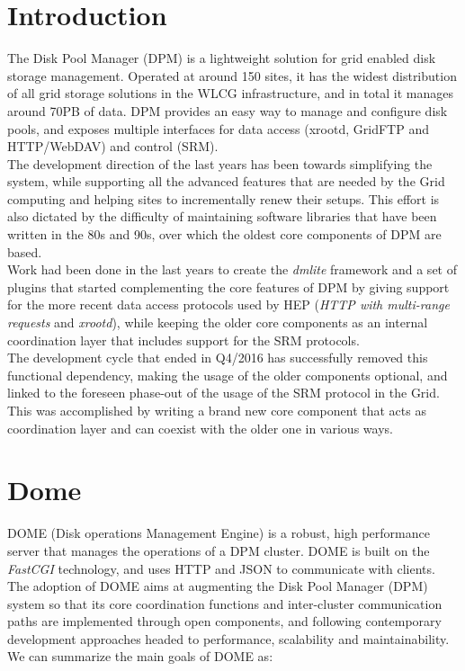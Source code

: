 \documentclass[a4paper]{jpconf}
\begin{document}
\section{Introduction}
The Disk Pool Manager (DPM) is a lightweight solution for grid enabled disk storage
management. Operated at around 150 sites, it has the widest distribution of all grid storage
solutions in the WLCG infrastructure, and in total it manages around 70PB of data. DPM provides
an easy way to manage and configure disk pools, and exposes multiple interfaces for
data access (xrootd, GridFTP and HTTP/WebDAV) and control (SRM).\\
The development direction of the last years has been towards simplifying the
system, while supporting all the advanced features that are needed by the Grid computing and
helping sites to incrementally renew their setups.
This effort is also dictated by the difficulty of maintaining software libraries that have been
written in the 80s and 90s, over which the oldest core components of DPM are based.\\
Work had been done in the last years to create the \textit{dmlite} \cite{dpmfuture} framework and a set of plugins
that started complementing the core features of DPM by giving support for the more recent
data access protocols used by HEP (\textit{HTTP with multi-range requests} and \textit{xrootd}),
while keeping the older core components as an internal coordination layer that includes
support for the SRM protocols.\\
The development cycle that ended in Q4/2016 has successfully removed this functional
dependency, making the usage of the older components optional, and linked to the
foreseen phase-out of the usage of the SRM protocol in the Grid. This was accomplished by
writing a brand new core component that acts as coordination layer and can coexist with the
older one in various ways.


\section{Dome}

DOME (Disk operations Management Engine) is a robust, high performance server that manages the operations of a DPM cluster. DOME is built on the \textit{FastCGI} \cite{fastcgi} technology,
and uses HTTP and JSON to communicate with clients.
The adoption of DOME aims at augmenting the Disk Pool Manager (DPM) system so that its core coordination functions and inter-cluster communication paths are
implemented through open components, and following contemporary development approaches headed to performance, scalability and maintainability. We can summarize the
main goals of DOME as:
\end{document}

